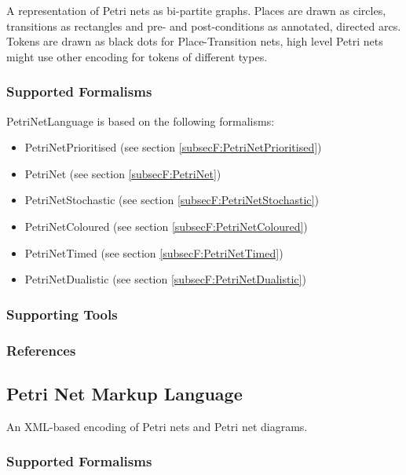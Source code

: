 A representation of Petri nets as bi-partite graphs. Places are drawn as circles, transitions as rectangles and pre- and post-conditions as annotated, directed arcs. Tokens are drawn as black dots for Place-Transition nets, high level Petri nets might use other encoding for tokens of different types.


\subsubsection{Supported Formalisms}

PetriNetLanguage is based on the following formalisms:
\begin{itemize}
	\item PetriNetPrioritised (see section \ref{subsecF:PetriNetPrioritised})
	\item PetriNet (see section \ref{subsecF:PetriNet})
	\item PetriNetStochastic (see section \ref{subsecF:PetriNetStochastic})
	\item PetriNetColoured (see section \ref{subsecF:PetriNetColoured})
	\item PetriNetTimed (see section \ref{subsecF:PetriNetTimed})
	\item PetriNetDualistic (see section \ref{subsecF:PetriNetDualistic})
\end{itemize}


\subsubsection{Supporting Tools}



\subsubsection{References}


\subsection{Petri Net Markup Language}
\label{subsecL:PNML}

An XML-based encoding of Petri nets and Petri net diagrams.


\subsubsection{Supported Formalisms}

